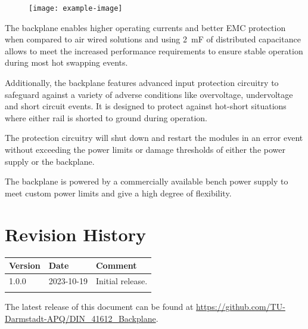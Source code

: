 \documentclass[10pt]{datasheet}
\begin{document}
\begin{figure}[ht]
    \centering
    \texttt{[image: example-image]}
\end{figure}

The backplane enables higher operating currents and better EMC protection when compared to air wired solutions and using \qty{2}{\milli\farad} of distributed capacitance allows to meet the increased performance requirements to ensure stable operation during most hot swapping events.

Additionally, the backplane features advanced input protection circuitry to safeguard against a variety of adverse conditions like overvoltage, undervoltage and short circuit events. It is designed to protect against hot-short situations where either rail is shorted to ground during operation.

The protection circuitry will shut down and restart the modules in an error event without exceeding the power limits or damage thresholds of either the power supply or the backplane.

The backplane is powered by a commercially available bench power supply to meet custom power limits and give a high degree of flexibility.

\vfill\break

\onecolumn

\section{Revision History}
\begin{table}[h]
    \centering
    \begin{tabularx}{\textwidth}{l| l | >{\raggedright\arraybackslash}X}
        \thickhline
        Version& Date& Comment\\
        \hline
        1.0.0 &2023-10-19 & Initial release.\\
        \thickhline
    \end{tabularx}
\end{table}

The latest release of this document can be found at \url{https://github.com/TU-Darmstadt-APQ/DIN_41612_Backplane}.

\begin{center}
\end{center}
\end{document}
